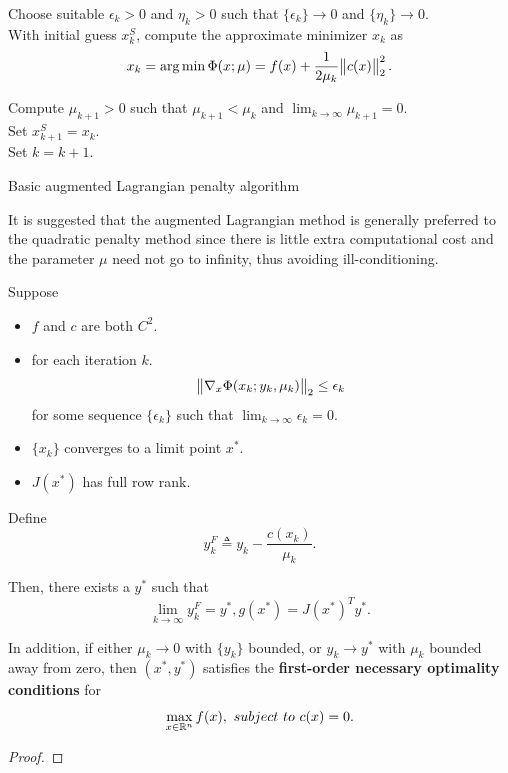 \begin{refsection}
\begin{algorithm}[H]
{		Choose suitable $\epsilon_k > 0$ and $\eta_k > 0$ such that $\{\epsilon_k\}\to 0$ and $\{\eta_k\} \to 0$.\\
		
		With initial guess $x_k^S$, compute the approximate minimizer $x_k$ as
		$$x_k = \arg\min \Phi(x;\mu) = f(x) + \frac{1}{2\mu_k} \norm{c(x)}_2^2.$$
		
		Compute $\mu_{k+1} > 0$ such that $\mu_{k+1} < \mu_k$ and $\lim_{k\to \infty} \mu_{k+1} = 0$.\\
		Set $x_{k+1}^S = x_k$.\\
		Set $k = k+1$.
	}
	\caption{Basic augmented Lagrangian penalty algorithm}
\end{algorithm}

\begin{remark}
It is suggested that the augmented Lagrangian method is generally preferred to the quadratic penalty method since there is little extra computational cost and the parameter $\mu$  need not go to infinity, thus avoiding ill-conditioning.
\end{remark}

\begin{lemma}
Suppose 
\begin{itemize}
	\item $f$ and $c$ are both $C^2$.
	\item for each iteration $k$.
	$$\norm{\nabla_x \Phi(x_k;y_k,\mu_k)}_2 \leq \epsilon_k$$
	for some sequence $\{\epsilon_k\}$ such that $\lim_{k\to \infty} \epsilon_k = 0$.
	\item $\{x_k\}$ converges to a limit point $x^*$.
	\item $J(x^*)$ has full row rank.
\end{itemize}
Define
$$y_k^F \triangleq y_k - \frac{c(x_k)}{\mu_k}.$$

Then, there exists a $y^*$ such that
$$\lim_{k\to \infty} y_k^F = y^*, g(x^*) = J(x^*)^Ty^*.$$

In addition, if either $\mu_k\to 0$ with $\{y_k\}$ bounded, or $y_k \to y^*$ with $\mu_k$ bounded away from zero, then $(x^*,y^*)$ satisfies the \textbf{first-order necessary optimality conditions} for 
$$\max_{x\in\mathbb{R}^n} f(x), ~subject~to~ c(x) = 0.$$
\end{lemma}
\begin{proof}
	

\end{proof}
\end{refsection}
